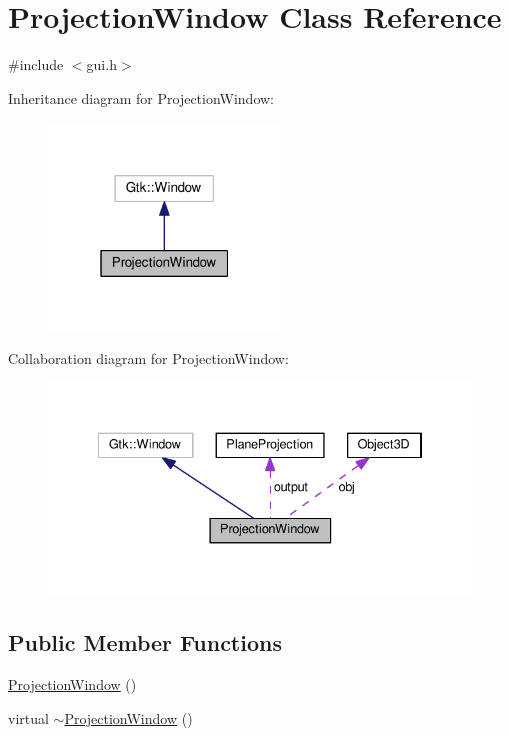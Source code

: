 \hypertarget{class_projection_window}{}\section{Projection\+Window Class Reference}
\label{class_projection_window}


{\ttfamily \#include $<$gui.\+h$>$}



Inheritance diagram for Projection\+Window\+:\nopagebreak
\begin{figure}[H]
\begin{center}
\leavevmode
\includegraphics[width=175pt]{class_projection_window__inherit__graph}
\end{center}
\end{figure}


Collaboration diagram for Projection\+Window\+:\nopagebreak
\begin{figure}[H]
\begin{center}
\leavevmode
\includegraphics[width=334pt]{class_projection_window__coll__graph}
\end{center}
\end{figure}
\subsection*{Public Member Functions}
\begin{DoxyCompactItemize}
\item 
\hyperlink{class_projection_window_aee1fc247d1c3bc98d8f7796151c322f3}{Projection\+Window} ()
\item 
virtual \hyperlink{class_projection_window_a14afc5c076475355348c92717fb3d767}{$\sim$\+Projection\+Window} ()
\end{DoxyCompactItemize}
